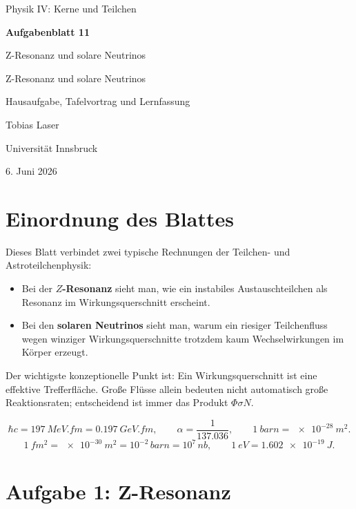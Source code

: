 \documentclass[11pt,a4paper]{scrartcl}
\newcommand{\CourseTitle}{COURSE NAME}
\newcommand{\DocumentKind}{DOCUMENT KIND}
\newcommand{\DocumentTitle}{DOCUMENT TITLE}
\newcommand{\DocumentSubtitle}{}
\newcommand{\AuthorName}{YOUR NAME}
\newcommand{\InstitutionName}{INSTITUTION NAME}
\newcommand{\SubmissionDate}{\today}
\newcommand{\makeuniversitytitle}{%
    \begin{titlepage}
        \centering
        \vspace*{2cm}
        {\Large \CourseTitle\par}
        \vspace{1.2cm}
        {\huge\bfseries \DocumentTitle\par}
        \ifx\DocumentSubtitle\empty\else
            \vspace{0.4cm}
            {\Large \DocumentSubtitle\par}
        \fi
        \vspace{1cm}
        {\Large \DocumentKind\par}
        \vfill
        {\large \AuthorName\par}
        \vspace{0.2cm}
        {\large \InstitutionName\par}
        \vspace{0.8cm}
        {\large \SubmissionDate\par}
    \end{titlepage}
    \pagenumbering{arabic}
}
\renewcommand{\CourseTitle}{Physik IV: Kerne und Teilchen}
\renewcommand{\DocumentKind}{Hausaufgabe, Tafelvortrag und Lernfassung}
\renewcommand{\DocumentTitle}{Aufgabenblatt 11}
\renewcommand{\DocumentSubtitle}{Z-Resonanz und solare Neutrinos}
\renewcommand{\AuthorName}{Tobias Laser}
\renewcommand{\InstitutionName}{Universit\"at Innsbruck}
\renewcommand{\SubmissionDate}{6. Juni 2026}
\theoremstyle{definition}
\theoremstyle{plain}
\theoremstyle{remark}
\begin{document}
\makeuniversitytitle
\tableofcontents
\newpage

\section*{Einordnung des Blattes}

\begin{summarybox}[title=Ziel dieses Blattes]
Dieses Blatt verbindet zwei typische Rechnungen der Teilchen- und Astroteilchenphysik:
\begin{itemize}
    \item Bei der \textbf{$Z$-Resonanz} sieht man, wie ein instabiles Austauschteilchen als Resonanz im Wirkungsquerschnitt erscheint.
    \item Bei den \textbf{solaren Neutrinos} sieht man, warum ein riesiger Teilchenfluss wegen winziger Wirkungsquerschnitte trotzdem kaum Wechselwirkungen im Körper erzeugt.
\end{itemize}
Der wichtigste konzeptionelle Punkt ist: Ein Wirkungsquerschnitt ist eine effektive Trefferfläche. Große Flüsse allein bedeuten nicht automatisch große Reaktionsraten; entscheidend ist immer das Produkt $\Phi\sigma N$.
\end{summarybox}

\begin{notebox}[title=Benutzte Konstanten und Konventionen]
\[
    \hbar c = \SI{197}{MeV.fm}=\SI{0.197}{GeV.fm},
    \qquad
    \alpha=\frac{1}{137.036},
    \qquad
    \SI{1}{barn}=\SI{e-28}{m^2}.
\]
\[
    \SI{1}{fm^2}=\SI{e-30}{m^2}=10^{-2}\,\si{barn}=10^7\,\si{nb},
    \qquad
    \SI{1}{eV}=\SI{1.602e-19}{J}.
\]
\end{notebox}

\FloatBarrier
\newpage

\section{Aufgabe 1: Z-Resonanz}
\end{document}

